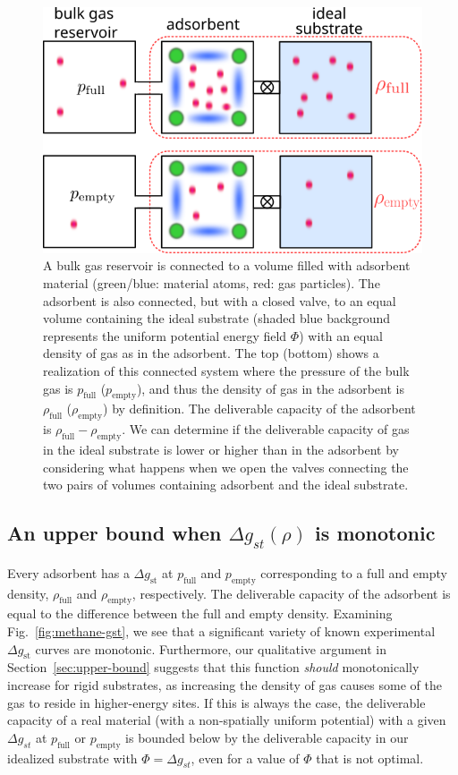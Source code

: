 \documentclass[twoside,twocolumn,9pt]{article}
\newcommand\V{\Phi}
\newcommand\pfull{\ensuremath{p_{\text{full}}}}
\newcommand\pempty{\ensuremath{p_{\text{empty}}}}
\newcommand\rhofull{\ensuremath{\rho_{\text{full}}}}
\newcommand\rhoempty{\ensuremath{\rho_{\text{empty}}}}
\newcommand\gst{\ensuremath{\Delta g_{st}}}
\begin{document}
\begin{figure}
\centering
\includegraphics[width=0.95\columnwidth]{four-cases-pro}
\caption{A bulk gas reservoir is connected to a volume filled with adsorbent material (green/blue: material atoms, red: gas particles). The adsorbent is also connected, but with a closed valve, to an equal volume containing the ideal substrate (shaded blue background represents the uniform potential energy field $\V$) with an equal density of gas as in the adsorbent. The top (bottom) shows a realization of this connected system where the pressure of the bulk gas is $\pfull$ ($\pempty$), and thus the density of gas in the adsorbent is $\rhofull$ ($\rhoempty$) by definition. The deliverable capacity of the adsorbent is $\rhofull - \rhoempty$. We can determine if the deliverable capacity of gas in the ideal substrate is lower or higher than in the adsorbent by considering what happens when we open the valves connecting the two pairs of volumes containing adsorbent and the ideal substrate.}
\label{fig:delta-gst-maximum}
\end{figure}

\subsection{An upper bound when $\gst(\rho)$ is monotonic}\label{sec:monotonic}
Every adsorbent has a $\Delta g_\text{st}$ at $\pfull$ and $\pempty$ corresponding
to a full and empty density, $\rhofull$ and $\rhoempty$, respectively. The deliverable capacity of the adsorbent is equal to
the difference between the full and empty density. Examining
Fig.~\ref{fig:methane-gst}, we see that a significant variety of known
experimental $\Delta g_\text{st}$ curves are monotonic. Furthermore, our
qualitative argument in Section~\ref{sec:upper-bound} suggests that this
function \emph{should} monotonically increase for rigid substrates, as
increasing the density of gas causes some of the gas to reside in higher-energy
sites. If this is always the case, the deliverable capacity of a real material
(with a non-spatially uniform potential) with a given $\gst$ at $\pfull$ or
$\pempty$ is bounded below by the deliverable capacity in our idealized
substrate with $\V=\gst$, even for a value of $\V$ that is not optimal.
\end{document}
